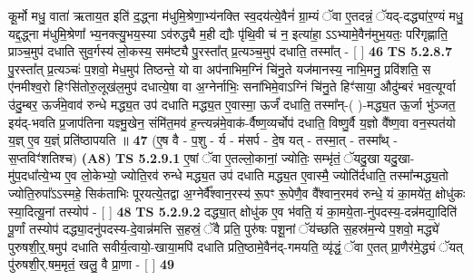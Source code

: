 \documentclass[17pt]{extarticle}
\begin{document}
                  कू॒र्मो मधु॒ वाता॑ ऋताय॒त इति॑ द॒द्ध्ना म॑धुमि॒श्रेणा॒भ्य॑नक्ति स्व॒दय॑त्ये॒वैनं॑ ग्रा॒म्यं ॅवा ए॒तदन्नं॒ ॅयद्-दद्ध्या॑र॒ण्यं मधु॒ यद्द॒द्ध्ना म॑धुमि॒श्रेणा᳚ भ्य॒नक्त्यु॒भय॒स्या ऽव॑रुद्ध्यै म॒ही द्यौः पृ॑थि॒वी च॑ न॒ इत्या॑हा॒ ऽऽभ्यामे॒वैन॑मुभ॒यतः॒ परि॑गृह्णाति॒ प्राञ्च॒मुप॑ दधाति सुव॒र्गस्य॑ लो॒कस्य॒ सम॑ष्ट्यै पु॒रस्ता᳚त् प्र॒त्यञ्च॒मुप॑ दधाति॒ तस्मा᳚त् - [  ] \textbf{  46} \newline
                  \newline
                                \textbf{ TS 5.2.8.7} \newline
                  पु॒रस्ता᳚त् प्र॒त्यञ्चः॑ प॒शवो॒ मेध॒मुप॑ तिष्ठन्ते॒ यो वा अप॑नाभिम॒ग्निं चि॑नु॒ते यज॑मानस्य॒ नाभि॒मनु॒ प्रवि॑शति॒ स ए॑नमीश्व॒रो हिꣳसि॑तोरु॒लूख॑ल॒मुप॑ दधात्ये॒षा वा अ॒ग्नेर्नाभिः॒ सना॑भिमे॒वाऽग्निं चि॑नु॒ते हिꣳ॑साया॒ औदु॑म्बरं भव॒त्यूर्ग्वा उ॑दु॒म्बर॒ ऊर्ज॑मे॒वाव॑ रुन्धे मद्ध्य॒त उप॑ दधाति मद्ध्य॒त ए॒वास्मा॒ ऊर्जं॑ दधाति॒ तस्मा᳚न्-( )-मद्ध्य॒त ऊ॒र्जा भु॑ञ्जत॒ इय॑द्-भवति प्र॒जाप॑तिना यज्ञ्मु॒खेन॒ संमि॑त॒मव॑ ह॒न्त्यन्न॑मे॒वाक॑-र्वैष्ण॒व्यर्चोप॑ दधाति॒ विष्णु॒र्वै य॒ज्ञो वै᳚ष्ण॒वा वन॒स्पत॑यो य॒ज्ञ् ए॒व य॒ज्ञ्ं प्रति॑ष्ठापयति ॥ \textbf{  47} \newline
                  \newline
                      (ए॒ष वै - प॒शु - र्य - म॑सर्प - दे॒ष यत् - तस्मा॒त् - तस्मा᳚थ् - स॒प्तविꣳ॑शतिश्च)  \textbf{(A8)} \newline \newline
                                        \textbf{ TS 5.2.9.1} \newline
                  ए॒षां ॅवा ए॒तल्लो॒कानां॒ ज्योतिः॒ सम्भृ॑तं॒ ॅयदु॒खा यदु॒खा-मु॑प॒दधा᳚त्ये॒भ्य ए॒व लो॒केभ्यो॒ ज्योति॒रव॑ रुन्धे मद्ध्य॒त उप॑ दधाति मद्ध्य॒त ए॒वास्मै॒ ज्योति॑र्दधाति॒ तस्मा᳚न्मद्ध्य॒तो ज्योति॒रुपा᳚ऽऽस्महे॒ सिक॑ताभिः पूरयत्ये॒तद्वा अ॒ग्नेर्वै᳚श्वान॒रस्य॑ रू॒पꣳ रू॒पेणै॒व वै᳚श्वान॒रमव॑ रुन्धे॒ यं का॒मये॑त॒ क्षोधु॑कः स्या॒दित्यू॒नां तस्योप॑ - [  ] \textbf{  48} \newline
                  \newline
                                \textbf{ TS 5.2.9.2} \newline
                  दद्ध्या॒त् क्षोधु॑क ए॒व भ॑वति॒ यं का॒मये॒ता-नु॑पदस्य॒-दन्न॑मद्या॒दिति॑ पू॒र्णां तस्योप॑ दद्ध्या॒दनु॑पदस्य-दे॒वान्न॑मत्ति स॒हस्रं॒ ॅवै प्रति॒ पुरु॑षः पशू॒नां ॅय॑च्छति स॒हस्र॑म॒न्ये प॒शवो॒ मद्ध्ये॑ पुरुषशी॒र्॒.षमुप॑ दधाति सवीर्य॒त्वायो॒-खाया॒मपि॑ दधाति प्रति॒ष्ठामे॒वैन॑द्-गमयति॒ व्यृ॑द्धं॒ ॅवा ए॒तत् प्रा॒णैर॑मे॒द्ध्यं ॅयत् पु॑रुषशी॒र्.षम॒मृतं॒ खलु॒ वै प्रा॒णा - [  ] \textbf{  49} \newline
\end{document}

